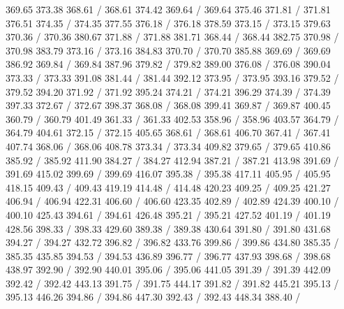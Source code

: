{ 369.65 373.38 368.61 /
 368.61 374.42 369.64 /
 369.64 375.46 371.81 /
 371.81 376.51 374.35 /
 374.35 377.55 376.18 /
 376.18 378.59 373.15 /
 373.15 379.63 370.36 /
 370.36 380.67 371.88 /
 371.88 381.71 368.44 /
 368.44 382.75 370.98 /
 370.98 383.79 373.16 /
 373.16 384.83 370.70 /
 370.70 385.88 369.69 /
 369.69 386.92 369.84 /
 369.84 387.96 379.82 /
 379.82 389.00 376.08 /
 376.08 390.04 373.33 /
 373.33 391.08 381.44 /
 381.44 392.12 373.95 /
 373.95 393.16 379.52 /
 379.52 394.20 371.92 /
 371.92 395.24 374.21 /
 374.21 396.29 374.39 /
 374.39 397.33 372.67 /
 372.67 398.37 368.08 /
 368.08 399.41 369.87 /
 369.87 400.45 360.79 /
 360.79 401.49 361.33 /
 361.33 402.53 358.96 /
 358.96 403.57 364.79 /
 364.79 404.61 372.15 /
 372.15 405.65 368.61 /
 368.61 406.70 367.41 /
 367.41 407.74 368.06 /
 368.06 408.78 373.34 /
 373.34 409.82 379.65 /
 379.65 410.86 385.92 /
 385.92 411.90 384.27 /
 384.27 412.94 387.21 /
 387.21 413.98 391.69 /
 391.69 415.02 399.69 /
 399.69 416.07 395.38 /
 395.38 417.11 405.95 /
 405.95 418.15 409.43 /
 409.43 419.19 414.48 /
 414.48 420.23 409.25 /
 409.25 421.27 406.94 /
 406.94 422.31 406.60 /
 406.60 423.35 402.89 /
 402.89 424.39 400.10 /
 400.10 425.43 394.61 /
 394.61 426.48 395.21 /
 395.21 427.52 401.19 /
 401.19 428.56 398.33 /
 398.33 429.60 389.38 /
 389.38 430.64 391.80 /
 391.80 431.68 394.27 /
 394.27 432.72 396.82 /
 396.82 433.76 399.86 /
 399.86 434.80 385.35 /
 385.35 435.85 394.53 /
 394.53 436.89 396.77 /
 396.77 437.93 398.68 /
 398.68 438.97 392.90 /
 392.90 440.01 395.06 /
 395.06 441.05 391.39 /
 391.39 442.09 392.42 /
 392.42 443.13 391.75 /
 391.75 444.17 391.82 /
 391.82 445.21 395.13 /
 395.13 446.26 394.86 /
 394.86 447.30 392.43 /
 392.43 448.34 388.40 /
}
